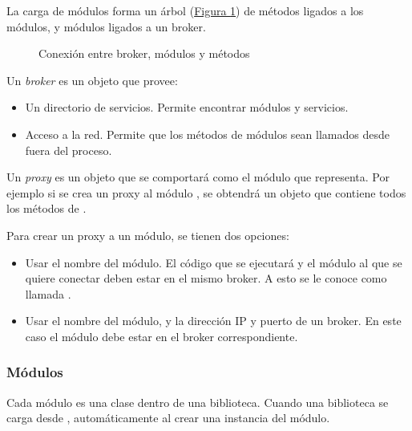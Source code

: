 La carga de módulos forma un árbol (\hyperref[\detokenize{chapter_one/naoqi:broker-mod-meth}]{Figura \ref{\detokenize{chapter_one/naoqi:broker-mod-meth}}}) de métodos
ligados a los módulos, y módulos ligados a un broker.

\begin{figure}[htbp]
\centering
\capstart

\noindent{}
\caption{Conexión entre broker, módulos y métodos}\label{\detokenize{chapter_one/naoqi:broker-mod-meth}}\end{figure}


\label{\detokenize{chapter_one/naoqi:broker}}
Un \textit{broker} es un objeto que provee:
\begin{itemize}
\item {} 
Un directorio de servicios. Permite encontrar módulos y servicios.

\item {} 
Acceso a la red. Permite que los métodos de módulos sean llamados desde fuera del proceso.

\end{itemize}

\label{\detokenize{chapter_one/naoqi:proxy}}
Un \textit{proxy} es un objeto que se comportará como el módulo que representa. Por
ejemplo si se crea un proxy al módulo , se obtendrá un objeto
que contiene todos los métodos de .

Para crear un proxy a un módulo, se tienen dos opciones:
\begin{itemize}
\item {} 
Usar el nombre del módulo. El código que se ejecutará y el módulo al que se quiere conectar deben estar en el mismo broker. A esto se le conoce como llamada .

\item {} 
Usar el nombre del módulo, y la dirección IP y puerto de un broker. En este caso el módulo debe estar en el broker correspondiente.

\end{itemize}


\subsubsection{Módulos}
\label{\detokenize{chapter_one/naoqi:modulos}}
Cada módulo es una clase dentro de una biblioteca. Cuando una
biblioteca se carga desde , automáticamente al crear una instancia del módulo.

